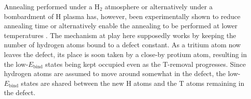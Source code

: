 Annealing performed under a H$_2$ atmosphere or alternatively under a bombardment of H plasma has, however, been experimentally shown to reduce annealing time or alternatively enable the annealing to be performed at lower temperatures \cite{alimov2011hydrogen, roth2013hydrogen, barton2014deuterium, ahlgren2019hydrogen}.
The mechanism at play here supposedly works by keeping the number of hydrogen atoms bound to a defect constant.  
As a tritium atom now leaves the defect, its place is soon taken by a close-by protium atom, resulting in the low-$E_{\text{bind}}$ states being kept occupied even as the T-removal progresses.
Since hydrogen atoms are assumed to move around somewhat in the defect, the low-$E_{\text{bind}}$ states are shared between the new H atoms and the T atoms remaining in the defect.

